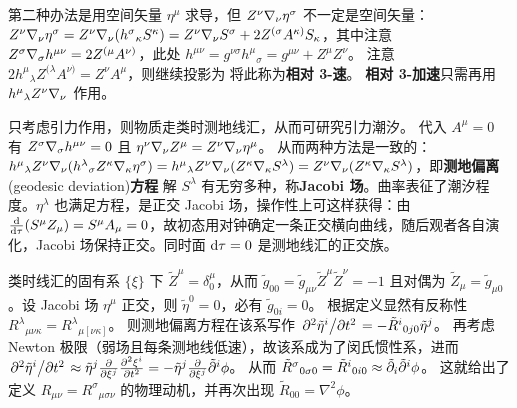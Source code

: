第二种办法是用空间矢量 $\eta^\mu$ 求导，但 $Z^\nu\nabla_\nu\eta^\sigma$ 不一定是空间矢量：
$Z^\nu\nabla_\nu\eta^\sigma = Z^\nu\nabla_\nu(h^\sigma{}_\kappa S^\kappa) = Z^\nu\nabla_\nu S^\sigma + 2 Z^{(\sigma} A^{\kappa)} S_\kappa$，其中注意 $Z^\sigma\nabla_\sigma h^{\mu\nu} = 2 Z^{(\mu} A^{\nu)}$，此处 $h^{\mu\nu} = g^{\nu\sigma}h^\mu{}_\sigma = g^{\mu\nu} + Z^\mu Z^\nu$。
注意 $2 h^\mu{}_\lambda Z^{(\lambda} A^{\nu)} = Z^\nu A^\mu$，则继续投影为
将此称为\textbf{相对 3-速}。
\textbf{相对 3-加速}只需再用 $h^\mu{}_\lambda Z^\nu\nabla_\nu$ 作用。

只考虑引力作用，则物质走类时测地线汇，从而可研究引力潮汐。
代入 $A^\mu=0$ 有 $Z^\sigma\nabla_\sigma h^{\mu\nu}=0$ 且 $\eta^\nu\nabla_\nu Z^\mu = Z^\nu\nabla_\nu \eta^\mu$。
从而两种方法是一致的：
$h^\mu{}_\lambda Z^\nu\nabla_\nu (h^\lambda{}_\sigma Z^\kappa\nabla_\kappa \eta^\sigma) = h^\mu{}_\lambda Z^\nu\nabla_\nu (Z^\kappa \nabla_\kappa S^\lambda) = Z^\nu\nabla_\nu (Z^\kappa \nabla_\kappa S^\lambda)$，即\textbf{测地偏离}(geodesic deviation)\textbf{方程}
解 $S^\lambda$ 有无穷多种，称\textbf{Jacobi 场}。曲率表征了潮汐程度。$\eta^\lambda$ 也满足方程，是正交 Jacobi 场，操作性上可这样获得：由 $\dv{\tau}(S^\mu Z_\mu) = S^\mu A_\mu = 0$，故初态用对钟确定一条正交横向曲线，随后观者各自演化，Jacobi 场保持正交。同时面 $\dd\tau = 0$ 是测地线汇的正交族。

类时线汇的固有系 $\{\xi\}$ 下 $\tilde Z^\mu=\delta^\mu_0$，从而 $\tilde g_{0 0}=\tilde g_{\mu\nu}\tilde Z^\mu\tilde Z^\nu=-1$ 且对偶为 $\tilde Z_\mu = \tilde g_{\mu0}$。设 Jacobi 场 $\eta^\mu$ 正交，则 $\tilde\eta^0=0$，必有 $\tilde g_{0i} = 0$。
根据定义显然有反称性 ${R^\lambda}_{\mu\nu\kappa}={R^\lambda}_{\mu[\nu\kappa]}$。
则测地偏离方程在该系写作 $\pdv*[2]{\tilde\eta^i}{t}=-\tilde R^i{}_{0 j 0} \tilde\eta^j$。
再考虑 Newton 极限（弱场且每条测地线低速），故该系成为了闵氏惯性系，进而 $\pdv*[2]{\tilde\eta^i}{t}\approx \tilde\eta^j \pdv{\xi^j}\pdv[2]{\xi^i}{t}=-\tilde\eta^j \pdv{\xi^j}\tilde{\partial}^i\phi$。
从而 $\tilde R^\sigma{}_{0 \sigma 0}=\tilde R^i{}_{0 i 0} \approx \tilde{\partial}_i\tilde{\partial}^i{\phi}$。
这就给出了定义 $R_{\mu\nu}={R^\sigma}_{\mu\sigma\nu}$ 的物理动机，并再次出现 $\tilde R_{00} = \nabla^2\phi$。

